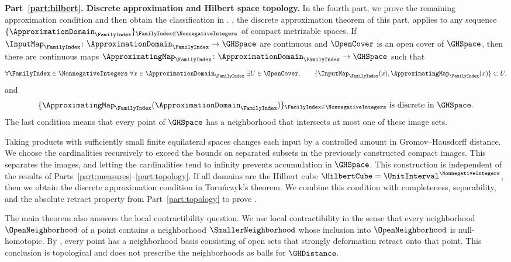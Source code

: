 

\medskip
\noindent\textbf{Part~\ref{part:hilbert}.
Discrete approximation and Hilbert space topology.}
In the fourth part,
we prove the remaining approximation condition and then
obtain the classification in .
,
the discrete approximation theorem of this part,
applies to any sequence
$\{\ApproximationDomain_\FamilyIndex\}_{\FamilyIndex\in\NonnegativeIntegers}$
of compact metrizable spaces.
If
$\InputMap_\FamilyIndex\colon\ApproximationDomain_\FamilyIndex\to\GHSpace$
are continuous and
$\OpenCover$
is an open cover of
$\GHSpace$,
then there are continuous maps
$\ApproximatingMap_\FamilyIndex\colon\ApproximationDomain_\FamilyIndex\to\GHSpace$
such that
\[
 \forall\FamilyIndex\in\NonnegativeIntegers\
 \forall x\in\ApproximationDomain_\FamilyIndex\
 \exists U\in\OpenCover,\qquad
 \{\InputMap_\FamilyIndex(x),\ApproximatingMap_\FamilyIndex(x)\}\subset U,
\]
and
\[
 \{\ApproximatingMap_\FamilyIndex(\ApproximationDomain_\FamilyIndex)
   \}_{\FamilyIndex\in\NonnegativeIntegers}
 \text{ is discrete in }\GHSpace.
\]
The last condition means that every point of
$\GHSpace$
has a neighborhood that intersects at most one of these image sets.

\paraid{p-66ca83693c4d}
Taking products with sufficiently small finite equilateral spaces changes each
input by a controlled amount in Gromov--Hausdorff distance.
We choose the cardinalities recursively to exceed the bounds on separated subsets
in the previously constructed compact images.
This separates the images,
and letting the cardinalities tend to infinity prevents accumulation in
$\GHSpace$.
This construction is independent of the results of Parts~\ref{part:measures}--\ref{part:topology}.
If all domains are the Hilbert cube
$\HilbertCube=\UnitInterval^{\NonnegativeIntegers}$,
then we obtain the discrete approximation condition in Toru\'nczyk's theorem.
We combine this condition with completeness,
separability,
and the absolute retract property from Part~\ref{part:topology}
to prove .

The main theorem also answers the local contractibility question.
We use local contractibility in the sense that every neighborhood
$\OpenNeighborhood $
of a point contains a neighborhood
$\SmallerNeighborhood $
whose inclusion into
$\OpenNeighborhood $
is null-homotopic.
By ,
every point has a neighborhood basis consisting of open sets that
strongly deformation retract onto that point.
This conclusion is topological and does not prescribe the neighborhoods
as balls for
$\GHDistance$.

